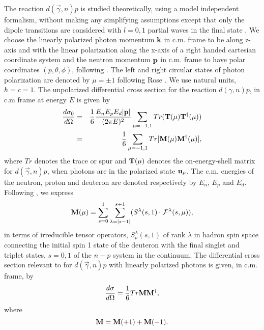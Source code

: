 The reaction $d(\vec \gamma, n)p$ is studied theoretically, using a model independent formalism, without making any simplifying assumptions  except that only the dipole transitions are considered with $l=0,1$  partial waves in the final state \cite{key50}. We choose the linearly polarized photon momentum ${\bf k}$ in c.m. frame to be along z-axis and with the linear polarization along the x-axis of a right handed cartesian coordinate system and the neutron momentum ${\bf p}$ in c.m. frame to have polar coordinates $(p,\theta,\phi)$, following \cite{key45}. The left and right circular states of photon polarization are denoted by $\mu =\pm 1$  following Rose \cite{key51}.  We use natural units, $\hbar = c=1$.  The unpolarized differential cross section for the reaction $d(\gamma, n)p$, in c.m frame at energy $E$ is given by 
\makeatletter
{}
\makeatother
\begin{eqnarray}
{d\sigma_0 \over d\Omega}&=&{1 \over 6} { E_n E_p E_d |{\bf p}| \over (2\pi E)^2 } \sum_{\mu=-1,1} Tr({\bf T}(\mu) {\bf T}^\dagger(\mu)) \nonumber \\ 
 &=& {1 \over 6} \sum_{\mu=-1,1} Tr[{\bf M}(\mu) {\bf M}^\dagger(\mu)], \label{chap20-eq1}
\end{eqnarray}
where $Tr$ denotes the trace or spur and ${\bf T}(\mu)$ denotes the on-energy-shell matrix for $d(\vec \gamma, n)p$,  when photons are in the polarized state ${\bf u}_\mu$. The c.m. energies of the neutron, proton and deuteron are denoted respectively by $E_n$, $E_p$ and  $E_d$.  Following \cite{key52}, we express 
\begin{equation}
{\bf M}(\mu) = \sum_{s=0}^1 \sum_{\lambda = |s-1|}^{s+1} (S^\lambda(s,1) \cdot {\mathcal F}^\lambda(s,\mu)), \label{chap20-eq2}
\end{equation}
in terms of irreducible tensor operators, $S^\lambda_{\nu}(s,1)$ of rank $\lambda$ in hadron spin space \cite{key53} connecting the initial spin 1 state of the deuteron with the final singlet and triplet states, $s=0,1$ of  the $n-p$ system in the continuum.  The differential cross section relevant to \cite{key45,key46} for $d(\vec \gamma, n)p$ with linearly  polarized photons is given, in c.m. frame, by  
\begin{eqnarray}
{d\sigma \over d\Omega} ={1 \over 6} Tr {\bf M M^\dagger}, \label{chap20-eq3}
\end{eqnarray}
where
\begin{equation} 
{\bf M= M}(+1)+{\bf M}(-1).\label{chap20-eq4}
\end{equation}
